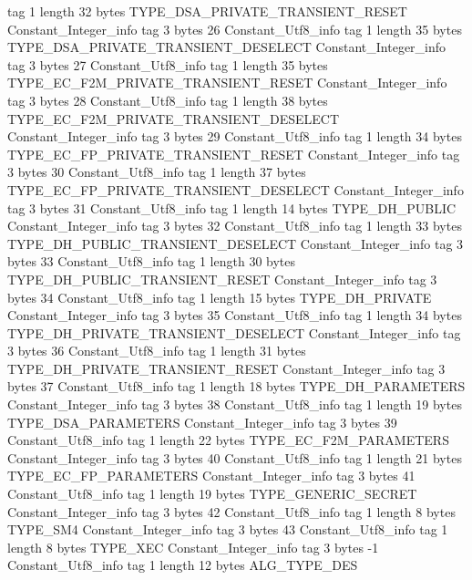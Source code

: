 {{{			tag	1
			length	32
			bytes	TYPE_DSA_PRIVATE_TRANSIENT_RESET
		}
		Constant_Integer_info {
			tag	3
			bytes	26
		}
		Constant_Utf8_info {
			tag	1
			length	35
			bytes	TYPE_DSA_PRIVATE_TRANSIENT_DESELECT
		}
		Constant_Integer_info {
			tag	3
			bytes	27
		}
		Constant_Utf8_info {
			tag	1
			length	35
			bytes	TYPE_EC_F2M_PRIVATE_TRANSIENT_RESET
		}
		Constant_Integer_info {
			tag	3
			bytes	28
		}
		Constant_Utf8_info {
			tag	1
			length	38
			bytes	TYPE_EC_F2M_PRIVATE_TRANSIENT_DESELECT
		}
		Constant_Integer_info {
			tag	3
			bytes	29
		}
		Constant_Utf8_info {
			tag	1
			length	34
			bytes	TYPE_EC_FP_PRIVATE_TRANSIENT_RESET
		}
		Constant_Integer_info {
			tag	3
			bytes	30
		}
		Constant_Utf8_info {
			tag	1
			length	37
			bytes	TYPE_EC_FP_PRIVATE_TRANSIENT_DESELECT
		}
		Constant_Integer_info {
			tag	3
			bytes	31
		}
		Constant_Utf8_info {
			tag	1
			length	14
			bytes	TYPE_DH_PUBLIC
		}
		Constant_Integer_info {
			tag	3
			bytes	32
		}
		Constant_Utf8_info {
			tag	1
			length	33
			bytes	TYPE_DH_PUBLIC_TRANSIENT_DESELECT
		}
		Constant_Integer_info {
			tag	3
			bytes	33
		}
		Constant_Utf8_info {
			tag	1
			length	30
			bytes	TYPE_DH_PUBLIC_TRANSIENT_RESET
		}
		Constant_Integer_info {
			tag	3
			bytes	34
		}
		Constant_Utf8_info {
			tag	1
			length	15
			bytes	TYPE_DH_PRIVATE
		}
		Constant_Integer_info {
			tag	3
			bytes	35
		}
		Constant_Utf8_info {
			tag	1
			length	34
			bytes	TYPE_DH_PRIVATE_TRANSIENT_DESELECT
		}
		Constant_Integer_info {
			tag	3
			bytes	36
		}
		Constant_Utf8_info {
			tag	1
			length	31
			bytes	TYPE_DH_PRIVATE_TRANSIENT_RESET
		}
		Constant_Integer_info {
			tag	3
			bytes	37
		}
		Constant_Utf8_info {
			tag	1
			length	18
			bytes	TYPE_DH_PARAMETERS
		}
		Constant_Integer_info {
			tag	3
			bytes	38
		}
		Constant_Utf8_info {
			tag	1
			length	19
			bytes	TYPE_DSA_PARAMETERS
		}
		Constant_Integer_info {
			tag	3
			bytes	39
		}
		Constant_Utf8_info {
			tag	1
			length	22
			bytes	TYPE_EC_F2M_PARAMETERS
		}
		Constant_Integer_info {
			tag	3
			bytes	40
		}
		Constant_Utf8_info {
			tag	1
			length	21
			bytes	TYPE_EC_FP_PARAMETERS
		}
		Constant_Integer_info {
			tag	3
			bytes	41
		}
		Constant_Utf8_info {
			tag	1
			length	19
			bytes	TYPE_GENERIC_SECRET
		}
		Constant_Integer_info {
			tag	3
			bytes	42
		}
		Constant_Utf8_info {
			tag	1
			length	8
			bytes	TYPE_SM4
		}
		Constant_Integer_info {
			tag	3
			bytes	43
		}
		Constant_Utf8_info {
			tag	1
			length	8
			bytes	TYPE_XEC
		}
		Constant_Integer_info {
			tag	3
			bytes	-1
		}
		Constant_Utf8_info {
			tag	1
			length	12
			bytes	ALG_TYPE_DES
}}}
